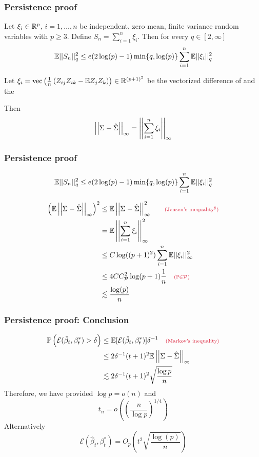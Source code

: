 \documentclass[12pt]{beamer}
\newcommand{\parenthetical}[2]{#1  \scriptstyle \alr{( #2)}}
\begin{document}
  \begin{frame}
  \frametitle{Persistence proof}
  Let $\xi_i  \in \mathbb{R}^p$, $i=1,\ldots,n$ be independent, zero mean, finite variance
random variables with $p \geq 3$.  Define $S_n = \sum_{i=1}^n \xi_i$. 
Then for every $q \in [2,\infty]$
\[
\mathbb{E} ||S_n ||_q^2 \leq e(2\log(p)-1) \min\{q, \log(p)\} \sum_{i=1}^n \mathbb{E} ||\xi_i||_q^2
\]

\vsp
Let $\xi_i = \textrm{vec}\left(\frac{1}{n} \left(Z_{ij}Z_{ik} - \mathbb{E} Z_{j}Z_{k}\right) \right) \in \mathbb{R}^{(p+1)^2}$ be the vectorized
difference of  and the 

\vsp
Then
\[
\left|\left| \Sigma - \hat\Sigma \right|\right|_{\infty}   = \left|\left|  \sum_{i=1}^n \xi_i \right|\right|_\infty
\]
\end{frame}


  \begin{frame}
  \frametitle{Persistence proof}

\[
\mathbb{E} ||S_n ||_q^2 \leq e(2\log(p)-1) \min\{q, \log(p)\} \sum_{i=1}^n \mathbb{E} ||\xi_i||_q^2
\]

\begin{align*}
\left(\E\norm{\Sigma - \hat\Sigma}_{\infty} \right)^2
& \leq
\E\norm{\Sigma - \hat\Sigma}_{\infty}^2  \parenthetical{\qquad}{\textrm{Jensen's inequality\Note}}\\
 & = 
\E \norm{ \sum_{i=1}^n \xi_i}_\infty^2 \\
 & \leq C \log( (p+1)^2)
\sum_{i=1}^n \E || \xi_i||_\infty^2 \\
 & \leq 4CC_{\mathcal{P}}^2 \log( p+1 ) \frac{1}{n} \parenthetical{\quad}{\P \in \mathcal{P}}\\
 & \lesssim \frac{\log(p)}{n}
\end{align*}
\end{frame}

  \begin{frame}
  \frametitle{Persistence proof: Conclusion}
  \begin{align}
\P\left(   \mathcal{E}(\hat\beta_t,\beta_t^*)  > \delta\right)
  & \leq
  \E[\mathcal{E}(\hat\beta_t,\beta_t^*) ] \delta^{-1} \parenthetical{\quad}{\textrm{Markov's inequality}}\\
& \leq   
  2\delta^{-1}(t+1)^2 \E \norm{\Sigma - \hat\Sigma}_{\infty}   \\
  & \lesssim
  2\delta^{-1}(t+1)^2 \sqrt{\frac{\log p}{n}}
    \end{align}
Therefore, we have  provided $\log p = o(n)$ and
\[
t_n = o\left( \left(\frac{n}{\log p} \right)^{1/4} \right)
\]
Alternatively
\[
\mathcal{E}(\hat\beta_t,\beta_t^*) = O_p\left( t^2\sqrt{\frac{\log(p)}{n}}\right)
\]

\end{frame}
\end{document}
